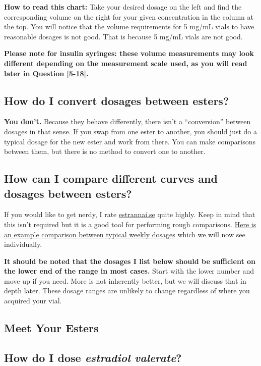 \documentclass{article}
\begin{document}
\textbf{How to read this chart:} Take your desired dosage on the left and find the corresponding volume on the right for your given concentration in the column at the top. You will notice that the volume requirements for 5 mg/mL vials to have reasonable dosages is not good. That is because 5 mg/mL vials are not good.

\textbf{Please note for insulin syringes: these volume measurements may look different depending on the measurement scale used, as you will read later in Question \ref{5-18}.}

\subsection{How do I convert dosages between esters?}

\textbf{You don’t.} Because they behave differently, there isn’t a “conversion” between dosages in that sense. If you swap from one ester to another, you should just do a typical dosage for the new ester and work from there. You can make comparisons between them, but there is no method to convert one to another.

\subsection{How can I compare different curves and dosages between esters?}

If you would like to get nerdy, I rate \href{https://estrannai.se}{estrannai.se} quite highly. Keep in mind that this isn’t required but it is a good tool for performing rough comparisons. \href{https://estrannai.se/\#i0__cu,7,7,1-cu,5,7,3-cu,5,7,2}{Here is an example comparison between typical weekly dosages} which we will now see individually.

\textbf{It should be noted that the dosages I list below should be sufficient on the lower end of the range in most cases.} Start with the lower number and move up if you need. More is not inherently better, but we will discuss that in depth later. These dosage ranges are unlikely to change regardless of where you acquired your vial.

\subsection*{Meet Your Esters}

\subsection{How do I dose \textit{estradiol valerate}?}
\end{document}
